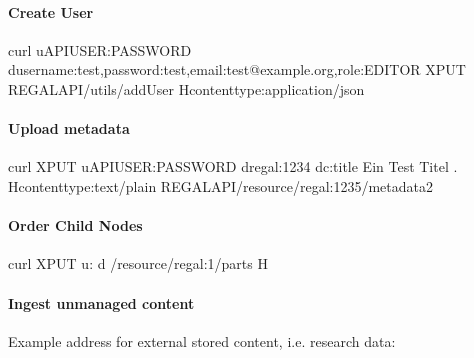\documentclass[letterpaper,10pt,english]{sphinxmanual}
\begin{document}
\paragraph{Create User}
\label{\detokenize{api-toscience:create-user}}\label{\detokenize{api-toscience:id6}}
\begin{sphinxVerbatim}[commandchars=\\\{\}]
curl \PYGZhy{}u\PYGZdl{}API\PYGZus{}USER:\PYGZdl{}PASSWORD \PYGZhy{}d\PYGZsq{}\PYGZob{}\PYGZdq{}username\PYGZdq{}:\PYGZdq{}test\PYGZdq{},\PYGZdq{}password\PYGZdq{}:\PYGZdq{}test\PYGZdq{},\PYGZdq{}email\PYGZdq{}:\PYGZdq{}test@example.org\PYGZdq{},\PYGZdq{}role\PYGZdq{}:\PYGZdq{}EDITOR\PYGZdq{}\PYGZcb{}\PYGZsq{} \PYGZhy{}XPUT \PYGZdl{}REGAL\PYGZus{}API/utils/addUser \PYGZhy{}H\PYGZsq{}content\PYGZhy{}type:application/json\PYGZsq{}
\end{sphinxVerbatim}


\paragraph{Upload metadata}
\label{\detokenize{api-toscience:upload-metadata}}\label{\detokenize{api-toscience:id7}}
\begin{sphinxVerbatim}[commandchars=\\\{\}]
curl \PYGZhy{}XPUT \PYGZhy{}u\PYGZdl{}API\PYGZus{}USER:\PYGZdl{}PASSWORD \PYGZhy{}d\PYGZsq{}\PYGZlt{}regal:1234\PYGZgt{} \PYGZlt{}dc:title\PYGZgt{} \PYGZdq{}Ein Test Titel\PYGZdq{} .\PYGZsq{} \PYGZhy{}H\PYGZdq{}content\PYGZhy{}type:text/plain\PYGZdq{} \PYGZdl{}REGAL\PYGZus{}API/resource/regal:1235/metadata2
\end{sphinxVerbatim}


\paragraph{Order Child Nodes}
\label{\detokenize{api-toscience:order-child-nodes}}
\begin{sphinxVerbatim}[commandchars=\\\{\}]
\PYGZdl{} curl \PYGZhy{}XPUT \PYGZhy{}u: \PYGZhy{}d /resource/regal:1/parts \PYGZhy{}H
\end{sphinxVerbatim}


\paragraph{Ingest unmanaged content}
\label{\detokenize{api-toscience:ingest-unmanaged-content}}\label{\detokenize{api-toscience:id8}}
\sphinxAtStartPar
Example address for external stored content, i.e. research data:
\end{document}
